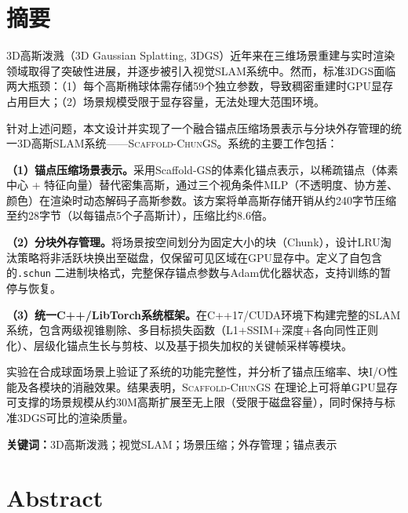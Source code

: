 \documentclass[zihao=-4,twoside,openright,fontset=none]{ctexbook}
\numberwithin{figure}{chapter}
\numberwithin{table}{chapter}
\numberwithin{equation}{chapter}
\newcommand{\ScaffoldChunGS}{\textsc{Scaffold-ChunGS}\xspace}
\newcommand{\schun}{\texttt{.schun}\xspace}
\begin{document}
\chapter*{\heiti{}\bfseries 摘\quad 要}

3D高斯泼溅（3D Gaussian Splatting, 3DGS）近年来在三维场景重建与实时渲染领域取得了突破性进展，并逐步被引入视觉SLAM系统中。然而，标准3DGS面临两大瓶颈：（1）每个高斯椭球体需存储59个独立参数，导致稠密重建时GPU显存占用巨大\cite{kerbl20233dgaussians}；（2）场景规模受限于显存容量，无法处理大范围环境。

针对上述问题，本文设计并实现了一个融合锚点压缩场景表示与分块外存管理的统一3D高斯SLAM系统——\ScaffoldChunGS。系统的主要工作包括：

\textbf{（1）锚点压缩场景表示。}采用Scaffold-GS的体素化锚点表示，以稀疏锚点（体素中心 + 特征向量）替代密集高斯，通过三个视角条件MLP（不透明度、协方差、颜色）在渲染时动态解码子高斯参数。该方案将单高斯存储开销从约240字节压缩至约28字节（以每锚点5个子高斯计），压缩比约8.6倍。

\textbf{（2）分块外存管理。}将场景按空间划分为固定大小的块（Chunk），设计LRU淘汰策略将非活跃块换出至磁盘，仅保留可见区域在GPU显存中。定义了自包含的\schun 二进制块格式，完整保存锚点参数与Adam优化器状态，支持训练的暂停与恢复。

\textbf{（3）统一C++/LibTorch系统框架。}在C++17/CUDA环境下构建完整的SLAM系统，包含两级视锥剔除、多目标损失函数（L1+SSIM+深度+各向同性正则化）、层级化锚点生长与剪枝、以及基于损失加权的关键帧采样等模块。

实验在合成球面场景上验证了系统的功能完整性，并分析了锚点压缩率、块I/O性能及各模块的消融效果。结果表明，\ScaffoldChunGS 在理论上可将单GPU显存可支撑的场景规模从约30M高斯扩展至无上限（受限于磁盘容量），同时保持与标准3DGS可比的渲染质量。

\vspace{1em}
\noindent\textbf{关键词：}3D高斯泼溅；视觉SLAM；场景压缩；外存管理；锚点表示

\chapter*{\bfseries Abstract}
\end{document}
